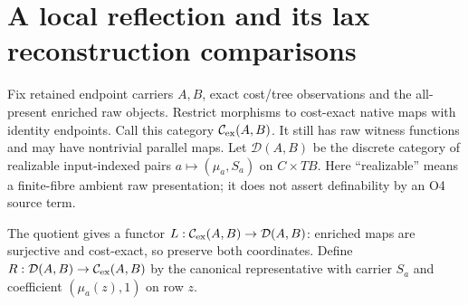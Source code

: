 \documentclass[11pt,a4paper]{article}
\theoremstyle{definition}
\begin{document}
\section{A local reflection and its lax reconstruction comparisons}
\label{sec:reflection}
Fix retained endpoint carriers $A,B$, exact cost/tree observations and
the all-present enriched raw objects. Restrict morphisms to cost-exact
native maps with identity endpoints. Call this category
$\mathcal C_{\rm ex}(A,B)$. It still has raw witness functions and may
have nontrivial parallel maps. Let $\mathcal D(A,B)$ be the discrete
category of realizable input-indexed pairs $a\mapsto(\mu_a,S_a)$ on
$C\times TB$. Here ``realizable'' means a finite-fibre ambient raw
presentation; it does not assert definability by an O4 source term.

The quotient gives a functor
$L:\mathcal C_{\rm ex}(A,B)\to\mathcal D(A,B)$: enriched maps are
surjective and cost-exact, so preserve both coordinates. Define
$R:\mathcal D(A,B)\to\mathcal C_{\rm ex}(A,B)$ by the canonical
representative with carrier $S_a$ and coefficient
$(\mu_a(z),1)$ on row $z$.
\end{document}
